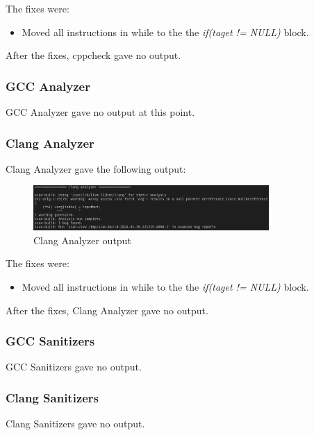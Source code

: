 \documentclass{article}
\begin{document}
The fixes were:

\begin{itemize}
    \item Moved all instructions in while to the the \textit{if(taget != NULL)} block.
\end{itemize}

After the fixes, cppcheck gave no output.

\subsubsection{GCC Analyzer}

GCC Analyzer gave no output at this point.

\subsubsection{Clang Analyzer}

Clang Analyzer gave the following output:

\begin{figure}[ht!]
    \centering
    \includegraphics[width=0.8\textwidth]{images/ex2/clangAnalyzer.png}
    \caption{Clang Analyzer output}\label{fig:ex2/clangAnalyzer}
\end{figure}

The fixes were:

\begin{itemize}
    \item Moved all instructions in while to the the \textit{if(taget != NULL)} block.
\end{itemize}

After the fixes, Clang Analyzer gave no output.

\subsubsection{GCC Sanitizers}

GCC Sanitizers gave no output.

\subsubsection{Clang Sanitizers}

Clang Sanitizers gave no output.
\end{document}
